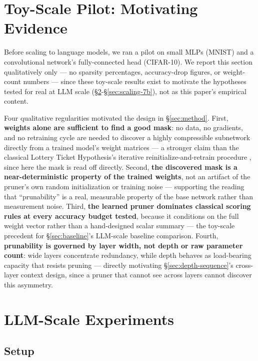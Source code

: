 \documentclass[11pt]{article}
\begin{document}
\section{Toy-Scale Pilot: Motivating Evidence}
\label{sec:toy-scale}

Before scaling to language models, we ran a pilot on small MLPs (MNIST) and a
convolutional network's fully-connected head (CIFAR-10). We report this
section qualitatively only --- no sparsity percentages, accuracy-drop figures,
or weight-count numbers --- since these toy-scale results exist to motivate
the hypotheses tested for real at LLM scale (\S\ref{sec:llm-experiments}-\S\ref{sec:scaling-7b}), not as this paper's
empirical content.

Four qualitative regularities motivated the design in \S\ref{sec:method}. First, \textbf{weights
alone are sufficient to find a good mask}: no data, no gradients, and no
retraining cycle are needed to discover a highly compressible subnetwork
directly from a trained model's weight matrices --- a stronger claim than the
classical Lottery Ticket Hypothesis's iterative reinitialize-and-retrain
procedure \citep{frankle2019lottery}, since here the mask is read off directly.
Second, \textbf{the discovered mask is a near-deterministic property of the
trained weights}, not an artifact of the pruner's own random
initialization or training noise --- supporting the reading that ``prunability''
is a real, measurable property of the base network rather than
measurement noise. Third, \textbf{the learned pruner dominates classical scoring
rules at every accuracy budget tested}, because it conditions on the full
weight vector rather than a hand-designed scalar summary --- the toy-scale
precedent for \S\ref{sec:baseline}'s LLM-scale baseline comparison. Fourth, \textbf{prunability is
governed by layer width, not depth or raw parameter count}: wide layers
concentrate redundancy, while depth behaves as load-bearing capacity that
resists pruning --- directly motivating \S\ref{sec:depth-sequence}'s cross-layer context design,
since a pruner that cannot see across layers cannot discover this asymmetry.

\section{LLM-Scale Experiments}
\label{sec:llm-experiments}

\subsection{Setup}
\label{sec:llm-setup}
\end{document}
